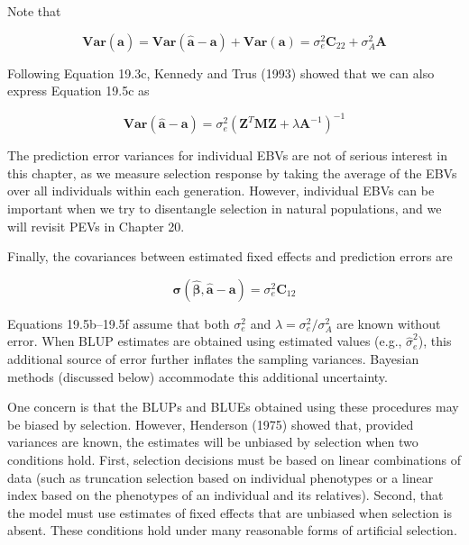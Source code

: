 \documentclass{article}
\begin{document}
Note that

\begin{equation}
\mathbf{V a r}(\widehat{\mathbf{a}})=\mathbf{V a r}(\widehat{\mathbf{a}}-\mathbf{a})+\mathbf{V a r}(\mathbf{a})=\sigma_{e}^{2}\mathbf{C}_{22}+\sigma_{A}^{2}\mathbf{A}
\tag{19.5d}
\label{eq:19_5d}
\end{equation}

Following Equation 19.3c, Kennedy and Trus (1993) showed that we can also express Equation 19.5c as

\begin{equation}
\mathbf{V a r}(\widehat{\mathbf{a}}-\mathbf{a})=\sigma_{e}^{2}\left(\mathbf{Z}^{T}\mathbf{M}\mathbf{Z}+\lambda\mathbf{A}^{-1}\right)^{-1}
\tag{19.5e}
\label{eq:19_5e}
\end{equation}

The prediction error variances for individual EBVs are not of serious interest in this chapter, as we measure selection response by taking the average of the EBVs over all individuals within each generation. However, individual EBVs can be important when we try to disentangle selection in natural populations, and we will revisit PEVs in Chapter 20.

Finally, the covariances between estimated fixed effects and prediction errors are

\begin{equation}
\boldsymbol{\sigma}(\widehat{\boldsymbol{\beta}},\widehat{\mathbf{a}}-\mathbf{a})=\sigma_{e}^{2}\mathbf{C}_{12}
\tag{19.5f}
\label{eq:19_5f}
\end{equation}

Equations 19.5b–19.5f assume that both  $ \sigma_e^2 $ and  $ \lambda = \sigma_e^2 / \sigma_A^2 $ are known without error. When BLUP estimates are obtained using estimated values (e.g.,  $ \hat{\sigma}_e^2 $), this additional source of error further inflates the sampling variances. Bayesian methods (discussed below) accommodate this additional uncertainty.

One concern is that the BLUPs and BLUEs obtained using these procedures may be biased by selection. However, Henderson (1975) showed that, provided variances are known, the estimates will be unbiased by selection when two conditions hold. First, selection decisions must be based on linear combinations of data (such as truncation selection based on individual phenotypes or a linear index based on the phenotypes of an individual and its relatives). Second, that the model must use estimates of fixed effects that are unbiased when selection is absent. These conditions hold under many reasonable forms of artificial selection.
\end{document}
